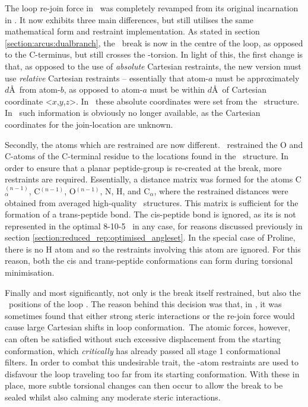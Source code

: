 The loop re-join force in \arcus\ was completely revamped from its original incarnation in \prearcus. It now exhibits three main differences, but still utilises the same mathematical form and restraint implementation. As stated in section \ref{section:arcus:dualbranch}, the \mainchain\ break is now in the centre of the loop, as opposed to the C-terminus, but still crosses the \Omg-torsion.
In light of this, the first change is that, as opposed to the use of \emph{absolute} Cartesian restraints, the new version must use \emph{relative} Cartesian restraints -- essentially that atom-$a$ must be approximately $d$\AA\ from atom-$b$, as opposed to atom-$a$ must be within $d$\AA\ of Cartesian coordinate \textless$x$,$y$,$z$\textgreater. In \prearcus\ these absolute coordinates were set from the \xray\ structure.
In \arcus\ such information is obviously no longer available, as the Cartesian coordinates for the join-location are unknown.

Secondly, the atoms which are restrained are now different. \prearcus\ restrained the O and C-atoms of the C-terminal residue to the locations found in the \xray\ structure. In order to ensure that a planar peptide-group is re-created at the break, more
restraints are required. Essentially, a distance matrix was formed for the atoms C$_\alpha^{(n-1)}$, C$^{(n-1)}$, O$^{(n-1)}$, N, H, and C$_\alpha$, where the restrained distances were obtained from averaged high-quality \xray\ structures.
This matrix is sufficient for the formation of a trans-peptide bond. The cis-peptide bond is ignored, as its is not represented in the optimal 8-10-5 \angleset\ in any case, for reasons discussed previously in section \ref{section:reduced_rep:optimised_angleset}. In the special case of Proline, there is no H atom and so the restraints involving this atom are ignored. For this reason, both the  cis and trans-peptide conformations can form during torsional minimisation.

Finally and most significantly, not only is the break itself restrained, but also the \ca\ positions of the loop \mainchain. The reason behind this decision was that, in \prearcus, it was sometimes found that either strong steric interactions or the re-join force would cause large Cartesian shifts in loop conformation.\ The atomic forces, however,  can often be satisfied without such excessive displacement from the starting conformation, which \emph{critically} has already passed all stage 1 conformational filters. In order to combat this undesirable trait, the \ca-atom restraints are used to disfavour the loop traveling too far from its starting conformation. With these in place, more subtle torsional changes can then occur to allow the break to be sealed whilst also calming any moderate steric interactions.

